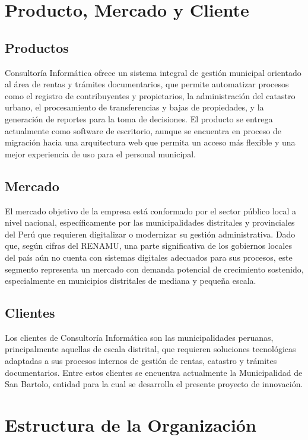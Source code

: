 \documentclass[12pt,a4paper]{report}
\begin{document}
\section{Producto, Mercado y Cliente}

\subsection{Productos}
Consultoría Informática ofrece un sistema integral de gestión municipal orientado al área de rentas y trámites documentarios, que permite automatizar procesos como el registro de contribuyentes y propietarios, la administración del catastro urbano, el procesamiento de transferencias y bajas de propiedades, y la generación de reportes para la toma de decisiones. El producto se entrega actualmente como software de escritorio, aunque se encuentra en proceso de migración hacia una arquitectura web que permita un acceso más flexible y una mejor experiencia de uso para el personal municipal.

\subsection{Mercado}
El mercado objetivo de la empresa está conformado por el sector público local a nivel nacional, específicamente por las municipalidades distritales y provinciales del Perú que requieren digitalizar o modernizar su gestión administrativa. Dado que, según cifras del RENAMU, una parte significativa de los gobiernos locales del país aún no cuenta con sistemas digitales adecuados para sus procesos, este segmento representa un mercado con demanda potencial de crecimiento sostenido, especialmente en municipios distritales de mediana y pequeña escala.

\subsection{Clientes}
Los clientes de Consultoría Informática son las municipalidades peruanas, principalmente aquellas de escala distrital, que requieren soluciones tecnológicas adaptadas a sus procesos internos de gestión de rentas, catastro y trámites documentarios. Entre estos clientes se encuentra actualmente la Municipalidad de San Bartolo, entidad para la cual se desarrolla el presente proyecto de innovación.

\section{Estructura de la Organización}
\end{document}
